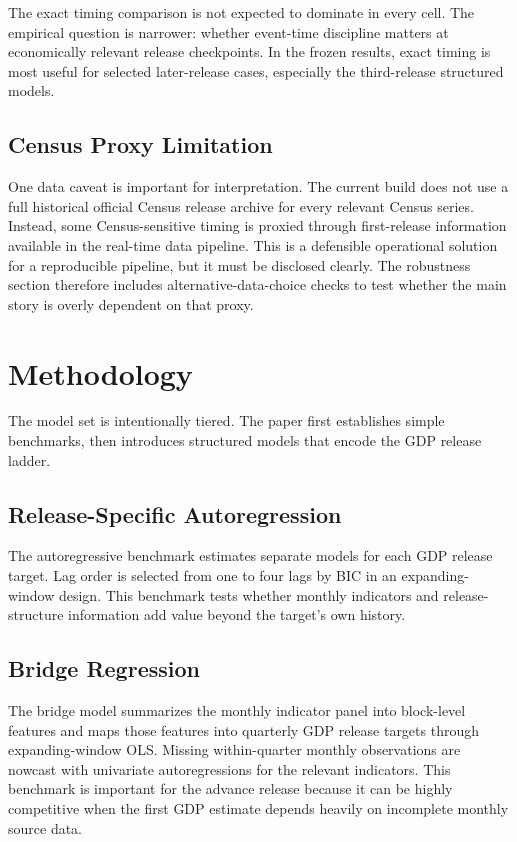 \documentclass[12pt]{article}
\begin{document}
The exact timing comparison is not expected to dominate in every cell. The empirical question is narrower: whether event-time discipline matters at economically relevant release checkpoints. In the frozen results, exact timing is most useful for selected later-release cases, especially the third-release structured models.

\subsection{Census Proxy Limitation}

One data caveat is important for interpretation. The current build does not use a full historical official Census release archive for every relevant Census series. Instead, some Census-sensitive timing is proxied through first-release information available in the real-time data pipeline. This is a defensible operational solution for a reproducible pipeline, but it must be disclosed clearly. The robustness section therefore includes alternative-data-choice checks to test whether the main story is overly dependent on that proxy.

\section{Methodology}
\label{sec:methodology}

The model set is intentionally tiered. The paper first establishes simple benchmarks, then introduces structured models that encode the GDP release ladder.

\subsection{Release-Specific Autoregression}

The autoregressive benchmark estimates separate models for each GDP release target. Lag order is selected from one to four lags by BIC in an expanding-window design. This benchmark tests whether monthly indicators and release-structure information add value beyond the target's own history.

\subsection{Bridge Regression}

The bridge model summarizes the monthly indicator panel into block-level features and maps those features into quarterly GDP release targets through expanding-window OLS. Missing within-quarter monthly observations are nowcast with univariate autoregressions for the relevant indicators. This benchmark is important for the advance release because it can be highly competitive when the first GDP estimate depends heavily on incomplete monthly source data.
\end{document}
